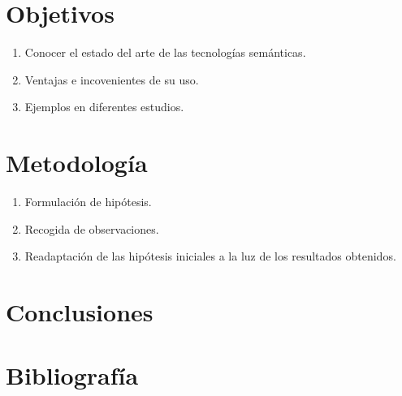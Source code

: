 \documentclass{article}
\begin{document}
\section{Objetivos}
\begin{enumerate}
    \item Conocer el estado del arte de las tecnologías semánticas.
    \item Ventajas e incovenientes de su uso.
    \item Ejemplos en diferentes estudios.
\end{enumerate}

\section{Metodología}
\begin{enumerate}
    \item Formulación de hipótesis.
    \item Recogida de observaciones.
    \item Readaptación de las hipótesis iniciales a la luz de los resultados obtenidos.
\end{enumerate}

\section{Conclusiones}

\section{Bibliografía}
\end{document}
